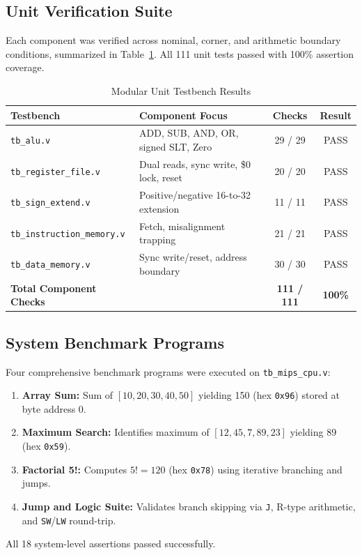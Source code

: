 \documentclass[conference]{IEEEtran}
\begin{document}
\subsection{Unit Verification Suite}
Each component was verified across nominal, corner, and arithmetic boundary conditions, summarized in Table~\ref{tab:unit_summary}. All 111 unit tests passed with 100\% assertion coverage.

\begin{table}[htbp]
\caption{Modular Unit Testbench Results}
\label{tab:unit_summary}
\begin{center}
\begin{tabular}{llcc}
\toprule
\textbf{Testbench} & \textbf{Component Focus} & \textbf{Checks} & \textbf{Result} \\
\midrule
\texttt{tb\_alu.v} & ADD, SUB, AND, OR, signed SLT, Zero & 29 / 29 & PASS \\
\texttt{tb\_register\_file.v} & Dual reads, sync write, \$0 lock, reset & 20 / 20 & PASS \\
\texttt{tb\_sign_extend.v} & Positive/negative 16-to-32 extension & 11 / 11 & PASS \\
\texttt{tb\_instruction_memory.v} & Fetch, misalignment trapping & 21 / 21 & PASS \\
\texttt{tb\_data_memory.v} & Sync write/reset, address boundary & 30 / 30 & PASS \\
\midrule
\textbf{Total Component Checks} & & \textbf{111 / 111} & \textbf{100\%} \\
\bottomrule
\end{tabular}
\end{center}
\end{table}

\subsection{System Benchmark Programs}
Four comprehensive benchmark programs were executed on \texttt{tb_mips_cpu.v}:
\begin{enumerate}
    \item \textbf{Array Sum:} Sum of $[10, 20, 30, 40, 50]$ yielding 150 (hex \texttt{0x96}) stored at byte address 0.
    \item \textbf{Maximum Search:} Identifies maximum of $[12, 45, 7, 89, 23]$ yielding 89 (hex \texttt{0x59}).
    \item \textbf{Factorial 5!:} Computes $5! = 120$ (hex \texttt{0x78}) using iterative branching and jumps.
    \item \textbf{Jump and Logic Suite:} Validates branch skipping via \texttt{J}, R-type arithmetic, and \texttt{SW}/\texttt{LW} round-trip.
\end{enumerate}
All 18 system-level assertions passed successfully.
\end{document}
